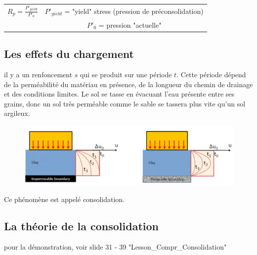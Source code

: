 \medskip

\begin{center}
\begin{tabular}{c|c}
    $R_p = \frac{P'_{yield}}{P'_0}$  &   $P'_{yield}$ = "yield" stress (pression de préconsolidation)  \\
      &  $P'_0$ = pression "actuelle"     
\end{tabular}
\end{center}

\subsection{Les effets du chargement}

il y a un renfoncement $s$ qui se produit sur une période $t$. Cette période dépend de la perméabilité du matériau en présence, de la longueur du chemin de drainage et des conditions limites. Le sol se tasse en évacuant l'eau présente entre ses grains, donc un sol très perméable comme le sable se tassera plus vite qu'un sol argileux. 

\begin{figure}[h!]
\center
   \includegraphics[scale=1]{Verastegui/images/V2.PNG}
\end{figure}

Ce phénomène est appelé consolidation.

\subsection{La théorie de la consolidation}

pour la démonstration, voir slide 31 - 39 "Lesson\_Compr\_Consolidation"

